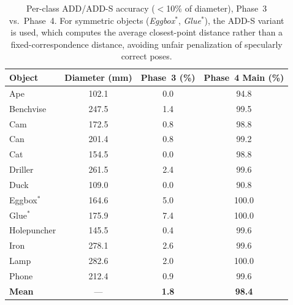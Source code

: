 \begin{table}[t]
\centering
    \caption{Per-class ADD/ADD-S accuracy ($<$10\% of diameter), Phase~3 vs.\ Phase~4. For symmetric objects (\textit{Eggbox}$^*$, \textit{Glue}$^*$), the ADD-S variant is used, which computes the average closest-point distance rather than a fixed-correspondence distance, avoiding unfair penalization of specularly correct poses.}
\label{tab:perclass}
\small
\setlength{\tabcolsep}{4pt}
\begin{tabular}{@{}lccc@{}}
\toprule
Object & Diameter (mm) & Phase~3 (\%) & Phase~4 Main (\%) \\
\midrule
Ape          & 102.1 & 0.0 & 94.8 \\
Benchvise    & 247.5 & 1.4 & 99.5 \\
Cam          & 172.5 & 0.8 & 98.8 \\
Can          & 201.4 & 0.8 & 99.2 \\
Cat          & 154.5 & 0.0 & 98.8 \\
Driller      & 261.5 & 2.4 & 99.6 \\
Duck         & 109.0 & 0.0 & 90.8 \\
Eggbox$^*$   & 164.6 & 5.0 & 100.0 \\
Glue$^*$     & 175.9 & 7.4 & 100.0 \\
Holepuncher  & 145.5 & 0.4 & 99.6 \\
Iron         & 278.1 & 2.6 & 99.6 \\
Lamp         & 282.6 & 2.0 & 100.0 \\
Phone        & 212.4 & 0.9 & 99.6 \\
\midrule
\textbf{Mean} & --- & \textbf{1.8} & \textbf{98.4} \\
\bottomrule
\end{tabular}
\end{table}

